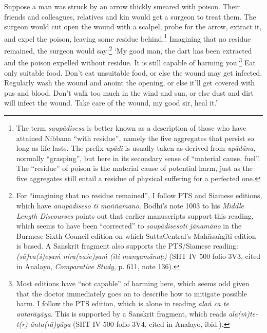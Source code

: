 \documentclass[12pt,openany]{book}%
\begin{document}
Suppose a man was struck by an arrow thickly smeared with poison. Their friends and colleagues, relatives and kin would get a surgeon to treat them. The surgeon would cut open the wound with a scalpel, probe for the arrow, extract it, and expel the poison, leaving some residue behind.\footnote{The term \textit{\textsanskrit{saupādisesa}} is better known as a description of those who have attained Nibbana “with residue”, namely the five aggregates that persist so long as life lasts. The prefix \textit{\textsanskrit{upādi}} is usually taken as derived from \textit{\textsanskrit{upādāna}}, normally “grasping”, but here in its secondary sense of “material cause, fuel”. The “residue” of poison is the material cause of potential harm, just as the five aggregates still entail a residue of physical suffering for a perfected one. } Imagining that no residue remained, the surgeon would say:\footnote{For “imagining that no residue remained”, I follow PTS and Siamese editions, which have \textit{\textsanskrit{anupādiseso} ti \textsanskrit{maññamāno}}. Bodhi’s note 1003 to his \emph{Middle Length Discourses} points out that earlier manuscripts support this reading, which seems to have been “corrected” to \textit{\textsanskrit{saupādisesoti} \textsanskrit{jānamāno}} in the Burmese Sixth Council edition on which SuttaCentral’s \textsanskrit{Mahāsaṅgīti} edition is based. A Sanskrit fragment also supports the PTS/Siamese reading: \textit{(\textsanskrit{sā})va(\textsanskrit{ś})\textsanskrit{eṣaṁ} nira(\textsanskrit{vaśe})\textsanskrit{ṣaṁ} (iti \textsanskrit{manyamānaḥ})} (SHT IV 500 folio 3V3, cited in Analayo, \emph{Comparative Study}, p. 611, note 136). } ‘My good man, the dart has been extracted and the poison expelled without residue. It is still capable of harming you.\footnote{Most editions have “not capable” of harming here, which seems odd given that the doctor immediately goes on to describe how to mitigate possible harm. I follow the PTS edition, which is alone in reading \textit{\textsanskrit{alañ} ca te \textsanskrit{antarāyāya}}. This is supported by a Sanskrit fragment, which reads \textit{ala(\textsanskrit{ṁ})te-t(r)-\textsanskrit{ānta}(\textsanskrit{rā})\textsanskrit{yāya}} (SHT IV 500 folio 3V4, cited in Analayo, ibid.). } Eat only suitable food. Don’t eat unsuitable food, or else the wound may get infected. Regularly wash the wound and anoint the opening, or else it’ll get covered with pus and blood. Don’t walk too much in the wind and sun, or else dust and dirt will infect the wound. Take care of the wound, my good sir, heal it.’ 
\end{document}
